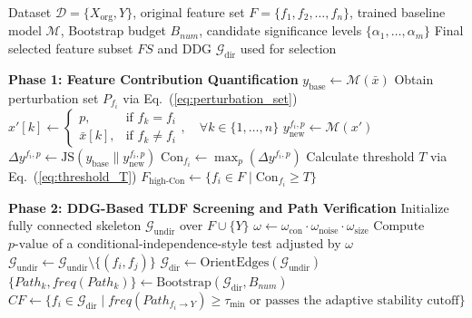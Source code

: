 \documentclass[journal]{IEEEtran}
\begin{document}
\begin{algorithm}[!t]
\caption{The CauFeature Framework}
\label{alg:caufeature}
\begin{algorithmic}[1]
\REQUIRE Dataset $\mathcal{D} = \{X_{\text{org}}, Y\}$, original feature set $F = \{f_1, f_2, \dots, f_n\}$, trained baseline model $\mathcal{M}$, Bootstrap budget $B_{num}$, candidate significance levels $\{\alpha_1,\ldots,\alpha_m\}$
\ENSURE Final selected feature subset $FS$ and DDG $\mathcal{G}_{\text{dir}}$ used for selection

\STATE \textbf{Phase 1: Feature Contribution Quantification}
\STATE $y_{\text{base}} \leftarrow \mathcal{M}(\bar{x})$
    \STATE Obtain perturbation set $P_{f_i}$ via Eq.~(\ref{eq:perturbation_set})
        \STATE $x'[k] \leftarrow \begin{cases} p, & \text{if } f_k = f_i \\ \bar{x}[k], & \text{if } f_k \neq f_i \end{cases}, \quad \forall k \in \{1, \dots, n\}$
        \STATE $y_{\text{new}}^{f_i,p} \leftarrow \mathcal{M}(x')$
        \STATE $\Delta y^{f_i,p} \leftarrow \text{JS}(y_{\text{base}} \parallel y_{\text{new}}^{f_i,p})$
    \ENDFOR
    \STATE $\text{Con}_{f_i} \leftarrow \max_{p}(\Delta y^{f_i,p})$
\ENDFOR
\STATE Calculate threshold $T$ via Eq.~(\ref{eq:threshold_T})
\STATE $F_{\text{high-Con}} \leftarrow \{ f_i \in F \mid \text{Con}_{f_i} \geq T \}$

\STATE \textbf{Phase 2: DDG-Based TLDF Screening and Path Verification}
\STATE Initialize fully connected skeleton $\mathcal{G}_{\text{undir}}$ over $F \cup \{Y\}$
    \STATE $\omega \leftarrow \omega_{\text{con}} \cdot \omega_{\text{noise}} \cdot \omega_{\text{size}}$
    \STATE Compute $p\text{-value}$ of a conditional-independence-style test adjusted by $\omega$
        \STATE $\mathcal{G}_{\text{undir}} \leftarrow \mathcal{G}_{\text{undir}} \setminus \{(f_i, f_j)\}$
    \ENDIF
\ENDFOR
\STATE $\mathcal{G}_{\text{dir}} \leftarrow \text{OrientEdges}(\mathcal{G}_{\text{undir}})$
\STATE $\{Path_k, freq(Path_k)\} \leftarrow \text{Bootstrap}(\mathcal{G}_{\text{dir}}, B_{num})$
\STATE $CF \leftarrow \Big\{ f_i \in \mathcal{G}_{\text{dir}} \mid freq(Path_{f_i \to Y}) \geq \tau_{\min} $
\STATE \qquad \qquad $\text{or passes the adaptive stability cutoff} \Big\}$


\end{algorithmic}
\end{algorithm}
\end{document}
